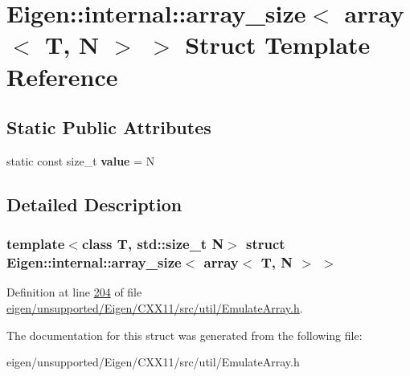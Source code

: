 \hypertarget{struct_eigen_1_1internal_1_1array__size_3_01array_3_01_t_00_01_n_01_4_01_4}{}\section{Eigen\+:\+:internal\+:\+:array\+\_\+size$<$ array$<$ T, N $>$ $>$ Struct Template Reference}
\label{struct_eigen_1_1internal_1_1array__size_3_01array_3_01_t_00_01_n_01_4_01_4}
\subsection*{Static Public Attributes}
\begin{DoxyCompactItemize}
\item 
\mbox{\label{struct_eigen_1_1internal_1_1array__size_3_01array_3_01_t_00_01_n_01_4_01_4_aae6615907a374ec404bc28e05e560ae2}} 
static const size\+\_\+t {\bfseries value} = N
\end{DoxyCompactItemize}


\subsection{Detailed Description}
\subsubsection*{template$<$class T, std\+::size\+\_\+t N$>$\newline
struct Eigen\+::internal\+::array\+\_\+size$<$ array$<$ T, N $>$ $>$}



Definition at line \hyperlink{eigen_2unsupported_2_eigen_2_c_x_x11_2src_2util_2_emulate_array_8h_source_l00204}{204} of file \hyperlink{eigen_2unsupported_2_eigen_2_c_x_x11_2src_2util_2_emulate_array_8h_source}{eigen/unsupported/\+Eigen/\+C\+X\+X11/src/util/\+Emulate\+Array.\+h}.



The documentation for this struct was generated from the following file\+:\begin{DoxyCompactItemize}
\item 
eigen/unsupported/\+Eigen/\+C\+X\+X11/src/util/\+Emulate\+Array.\+h\end{DoxyCompactItemize}
